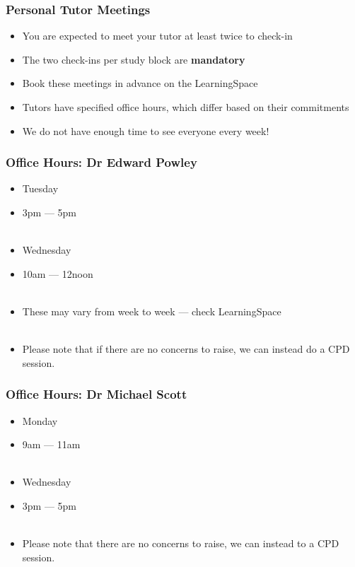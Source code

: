 \begin{frame}
	\frametitle{Personal Tutor Meetings}	
	\begin{itemize}
		\item You are expected to meet your tutor at least twice to check-in
		\item The two check-ins per study block are \textbf{mandatory}
		\item Book these meetings in advance on the LearningSpace
		
		\item Tutors have specified office hours, which differ based on their commitments
		\item We do not have enough time to see everyone every week! 
	\end{itemize}
\end{frame}

\begin{frame}
	\frametitle{Office Hours: Dr Edward Powley}	
	\begin{itemize}
		\item Tuesday
		\item 3pm --- 5pm
		\\~\\
	
		\item Wednesday
		\item 10am --- 12noon
		\\~\\
		\item These may vary from week to week --- check LearningSpace
		\\~\\
		\item Please note that if there are no concerns to raise, we can instead do a CPD session.
	\end{itemize}
\end{frame}

\begin{frame}
	\frametitle{Office Hours: Dr Michael Scott}	
	\begin{itemize}
		\item Monday
		\item 9am --- 11am
		\\~\\
	
		\item Wednesday
		\item 3pm --- 5pm
		\\~\\
		\item Please note that there are no concerns to raise, we can instead to a CPD session.
	\end{itemize}
\end{frame}

